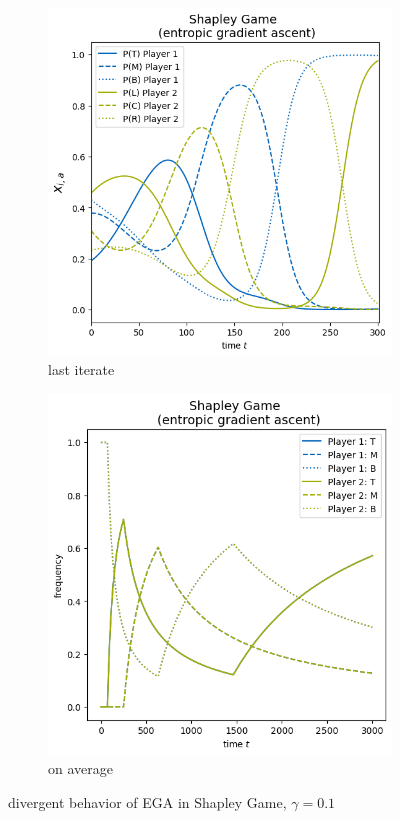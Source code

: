 \begin{figure}[H]
\centering
\begin{subfigure}{.5\textwidth}
    \centering
    \includegraphics[width=\textwidth]{logos/Shapley1.png}
    \caption{last iterate}
\end{subfigure}%
\begin{subfigure}{.5\textwidth}
    \centering
    \includegraphics[width=\textwidth]{logos/Shapley2.png}
    \caption{on average}
\end{subfigure}
\caption{divergent behavior of EGA in Shapley Game, $\gamma = 0.1$}
\label{fig:Shapley}
\end{figure}


